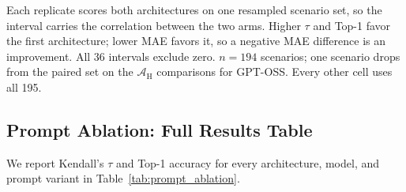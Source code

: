 \documentclass[11pt]{article}
\begin{document}
Each replicate scores both architectures on one resampled scenario set, so the interval carries the correlation between the two arms. Higher $\tau$ and Top-1 favor the first architecture; lower MAE favors it, so a negative MAE difference is an improvement. All 36 intervals exclude zero. $n = 194$ scenarios; one scenario drops from the paired set on the $\mathcal{A}_{\text{H}}$ comparisons for GPT-OSS. Every other cell uses all 195.

\subsection{Prompt Ablation: Full Results Table}
\label{app:prompt-ablation-full}

We report Kendall's $\tau$ and Top-1 accuracy for every architecture, model, and prompt variant in Table~\ref{tab:prompt_ablation}.
\end{document}
